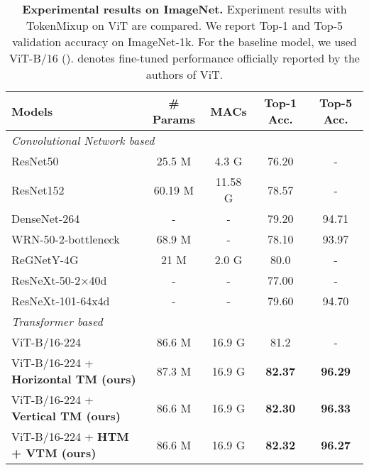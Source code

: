 \documentclass{article}
\begin{document}
\begin{table}[t]
    \centering
    \setlength{\tabcolsep}{3.5pt}
    \caption{ \footnotesize \textbf{Experimental results on ImageNet.} Experiment results with TokenMixup on ViT are compared. We report Top-1 and Top-5 validation accuracy on ImageNet-1k. For the baseline model, we used ViT-B/16 ().  denotes fine-tuned performance officially reported by the authors of ViT.}
    \begin{adjustbox}{width=0.9\textwidth}
    \begin{tabular}{l@{\hskip 0.3in} |@{\hskip 0.1in} c c@{\hskip 0.1in} |@{\hskip 0.1in} c@{\hskip 0.1in} c@{\hskip 0.1in}}
        \toprule
        \textbf{Models} & \textbf{\# Params} & \textbf{MACs} & \textbf{Top-1 Acc.} & \textbf{Top-5 Acc.}  \\
        \midrule
        \midrule
        \multicolumn{5}{l}{\textit{Convolutional Network based}} \\ 
        \midrule
        ResNet50~\cite{he2016deep} & 25.5 M & 4.3 G & 76.20 & - \\
        ResNet152~\cite{he2016deep} & 60.19 M & 11.58 G & 78.57 & - \\
        DenseNet-264~\cite{huang2017densely} & - & - & 79.20 & 94.71 \\
        WRN-50-2-bottleneck~\cite{zagoruyko2016wide} & 68.9 M & - & 78.10 & 93.97 \\
        ReGNetY-4G~\cite{radosavovic2020designing} & 21 M & 2.0 G & 80.0 & - \\
        ResNeXt-50-2×40d~\cite{xie2017aggregated} & - & - & 77.00 & - \\
        ResNeXt-101-64x4d~\cite{xie2017aggregated} & - & - & 79.60 & 94.70 \\
        \midrule
        \multicolumn{5}{l}{\textit{Transformer based}} \\ 
        \midrule
        ViT-B/16-224 ~\cite{dosovitskiy2020image}  & 86.6 M & 16.9 G  & 81.2 & - \\
        ViT-B/16-224 + \textbf{Horizontal TM (ours)} & 87.3 M & 16.9 G &  \cellcolor{yellow!25}\textbf{82.37} & \textbf{96.29} \\
        ViT-B/16-224 + \textbf{Vertical TM (ours)} & 86.6 M & 16.9 G & \textbf{82.30} & \cellcolor{yellow!25}\textbf{96.33} \\ ViT-B/16-224 + \textbf{HTM + VTM (ours)} & 86.6 M & 16.9 G & \textbf{82.32} & \textbf{96.27} \\ \bottomrule
    \end{tabular}
    \end{adjustbox}
    \label{tab:imagenet}
\end{table}
\end{document}
